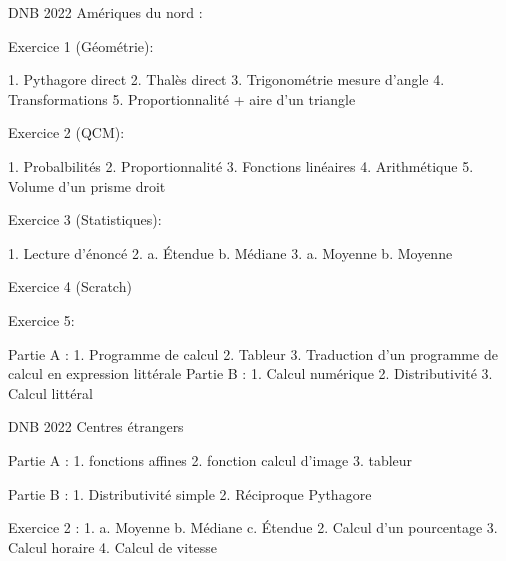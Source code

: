 \documentclass{article}
\begin{document}
DNB 2022 Amériques du nord :

Exercice 1 (Géométrie): 

    1. Pythagore direct
    2. Thalès direct
    3. Trigonométrie mesure d'angle
    4. Transformations
    5. Proportionnalité + aire d'un triangle

Exercice 2 (QCM):

    1. Probalbilités
    2. Proportionnalité
    3. Fonctions linéaires
    4. Arithmétique
    5. Volume d'un prisme droit

Exercice 3 (Statistiques):

    1. Lecture d'énoncé
    2. a. Étendue
       b. Médiane
    3. a. Moyenne
       b. Moyenne

Exercice 4 (Scratch)

Exercice 5:

    Partie A :
        1. Programme de calcul
        2. Tableur
        3. Traduction d'un programme de calcul en expression littérale
    Partie B :
        1. Calcul numérique
        2. Distributivité
        3. Calcul littéral

DNB 2022 Centres étrangers

Partie A :
    1. fonctions affines
    2. fonction calcul d'image
    3. tableur

Partie B :
    1. Distributivité simple
    2. Réciproque Pythagore

Exercice 2 :
 1. a. Moyenne
    b. Médiane
    c. Étendue
2. Calcul d'un pourcentage
3. Calcul horaire
4. Calcul de vitesse
\end{document}
